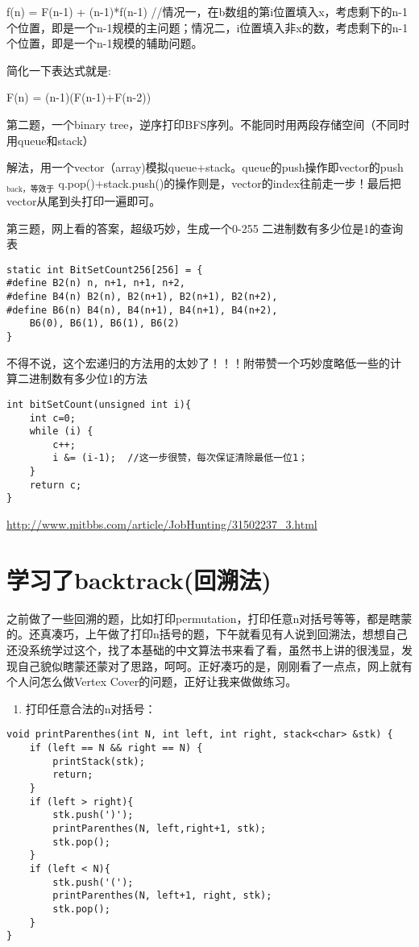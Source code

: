 \documentclass[12pt]{book}
\begin{document}
f(n) = F(n-1) + (n-1)*f(n-1)   //情况一，在b数组的第i位置填入x，考虑剩下的n-1个位置，即是一个n-1规模的主问题；情况二，i位置填入非x的数，考虑剩下的n-1个位置，即是一个n-1规模的辅助问题。

简化一下表达式就是:

F(n) = (n-1)(F(n-1)+F(n-2))

第二题，一个binary tree，逆序打印BFS序列。不能同时用两段存储空间（不同时用queue和stack）

解法，用一个vector（array)模拟queue+stack。queue的push操作即vector的push$_{\text{back，等效于}}$ q.pop()+stack.push()的操作则是，vector的index往前走一步！最后把vector从尾到头打印一遍即可。

第三题，网上看的答案，超级巧妙，生成一个0-255 二进制数有多少位是1的查询表
\lstset{language=java,label= ,caption= ,numbers=none}
\begin{lstlisting}
static int BitSetCount256[256] = {
#define B2(n) n, n+1, n+1, n+2,
#define B4(n) B2(n), B2(n+1), B2(n+1), B2(n+2),
#define B6(n) B4(n), B4(n+1), B4(n+1), B4(n+2),
    B6(0), B6(1), B6(1), B6(2)
}
\end{lstlisting}

不得不说，这个宏递归的方法用的太妙了！！！附带赞一个巧妙度略低一些的计
算二进制数有多少位1的方法
\lstset{language=java,label= ,caption= ,numbers=none}
\begin{lstlisting}
int bitSetCount(unsigned int i){
    int c=0;
    while (i) {
        c++;
        i &= (i-1);  //这一步很赞，每次保证清除最低一位1；
    }
    return c;
}
\end{lstlisting}

\url{http://www.mitbbs.com/article/JobHunting/31502237_3.html}

\section{学习了backtrack(回溯法)}
\label{sec-18-3}

之前做了一些回溯的题，比如打印permutation，打印任意n对括号等等，都是瞎蒙的。还真凑巧，上午做了打印n括号的题，下午就看见有人说到回溯法，想想自己还没系统学过这个，找了本基础的中文算法书来看了看，虽然书上讲的很浅显，发现自己貌似瞎蒙还蒙对了思路，呵呵。正好凑巧的是，刚刚看了一点点，网上就有个人问怎么做Vertex Cover的问题，正好让我来做做练习。

\begin{enumerate}
\item 打印任意合法的n对括号：
\end{enumerate}
\lstset{language=java,label= ,caption= ,numbers=none}
\begin{lstlisting}
void printParenthes(int N, int left, int right, stack<char> &stk) {
    if (left == N && right == N) {
        printStack(stk);
        return;
    }
    if (left > right){
        stk.push(')');
        printParenthes(N, left,right+1, stk);
        stk.pop();
    }
    if (left < N){
        stk.push('(');
        printParenthes(N, left+1, right, stk);
        stk.pop();
    }   
}
\end{lstlisting}
\end{document}
